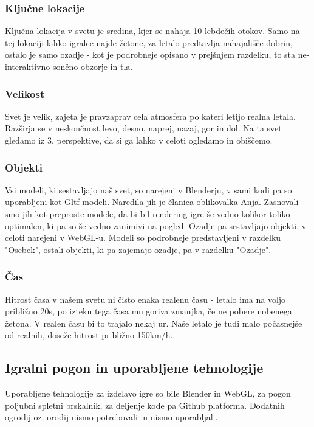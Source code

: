 \documentclass[a4paper]{article}
\begin{document}
\subsubsection{Ključne lokacije}%
Ključna lokacija v svetu je sredina, kjer se nahaja 10 lebdečih otokov. Samo na tej lokaciji lahko igralec najde žetone, za letalo predtavlja nahajališče dobrin, ostalo je samo ozadje - kot je podrobneje opisano v prejšnjem razdelku, to sta ne-interaktivno sončno obzorje in tla.

\subsubsection{Velikost}%
Svet je velik, zajeta je pravzaprav cela atmosfera po kateri letijo realna letala. Razširja se v neskončnost levo, desno, naprej, nazaj, gor in dol. Na ta svet gledamo iz 3. perspektive, da si ga lahko v celoti ogledamo in obiščemo. 

\subsubsection{Objekti}%
Vsi modeli, ki sestavljajo naš svet, so narejeni v Blenderju, v sami kodi pa so uporabljeni kot Gltf modeli. Naredila jih je članica oblikovalka Anja. Zasnovali smo jih kot preproste modele, da bi bil rendering igre še vedno kolikor toliko optimalen, ki pa so še vedno zanimivi na pogled. Ozadje pa sestavljajo objekti, v celoti narejeni v WebGL-u. Modeli so podrobneje predstavljeni v razdelku "Osebek", ostali objekti, ki pa zajemajo ozadje, pa v razdelku "Ozadje". 

\subsubsection{Čas}%
Hitrost časa v našem svetu ni čisto enaka realenu času - letalo ima na voljo približno 20s, po izteku tega časa mu goriva zmanjka, če ne pobere nobenega žetona. V realen času bi to trajalo nekaj ur. Naše letalo je tudi malo počasnejše od realnih, doseže hitrost približno 150km/h.

\subsection{Igralni pogon in uporabljene tehnologije}%
Uporabljene tehnologije za izdelavo igre so bile Blender in WebGL, za pogon poljubni spletni brskalnik, za deljenje kode pa Github platforma. Dodatnih ogrodij oz. orodij nismo potrebovali in nismo uporabljali.
\end{document}
